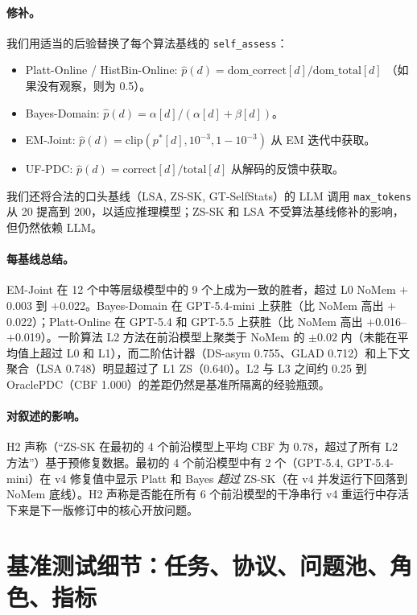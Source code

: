 \documentclass[11pt,a4paper,fontset=fandol]{ctexart}
\begin{document}
\paragraph{修补。} 我们用适当的后验替换了每个算法基线的 \texttt{self\_assess}：
\begin{itemize}[nosep,leftmargin=1.4em]
  \item Platt-Online / HistBin-Online: $\hat p(d) = \mathrm{dom\_correct}[d] / \mathrm{dom\_total}[d]$ （如果没有观察，则为 0.5）。
  \item Bayes-Domain: $\hat p(d) = \alpha[d]/(\alpha[d]+\beta[d])$。
  \item EM-Joint: $\hat p(d) = \mathrm{clip}(p^*[d], 10^{-3}, 1{-}10^{-3})$ 从 EM 迭代中获取。
  \item UF-PDC: $\hat p(d) = \mathrm{correct}[d]/\mathrm{total}[d]$ 从解码的反馈中获取。
\end{itemize}
我们还将合法的口头基线（LSA, ZS-SK, GT-SelfStats）的 LLM 调用 \texttt{max\_tokens} 从 20 提高到 200，以适应推理模型；ZS-SK 和 LSA 不受算法基线修补的影响，但仍然依赖 LLM。

\paragraph{每基线总结。} EM-Joint 在 12 个中等层级模型中的 9 个上成为一致的胜者，超过 L0 NoMem $+$0.003 到 $+$0.022。Bayes-Domain 在 GPT-5.4-mini 上获胜（比 NoMem 高出 $+$0.022）；Platt-Online 在 GPT-5.4 和 GPT-5.5 上获胜（比 NoMem 高出 $+$0.016--$+$0.019）。一阶算法 L2 方法在前沿模型上聚类于 NoMem 的 $\pm 0.02$ 内（未能在平均值上超过 L0 和 L1），而二阶估计器（DS-asym 0.755、GLAD 0.712）和上下文聚合（LSA 0.748）明显超过了 L1 ZS（0.640）。L2 与 L3 之间约 0.25 到 OraclePDC（CBF 1.000）的差距仍然是基准所隔离的经验瓶颈。



\paragraph{对叙述的影响。} H2 声称（“ZS-SK 在最初的 4 个前沿模型上平均 CBF 为 0.78，超过了所有 L2 方法”）基于预修复数据。最初的 4 个前沿模型中有 2 个（GPT-5.4, GPT-5.4-mini）在 v4 修复值中显示 Platt 和 Bayes \emph{超过} ZS-SK（在 v4 并发运行下回落到 NoMem 底线）。H2 声称是否能在所有 6 个前沿模型的干净串行 v4 重运行中存活下来是下一版修订中的核心开放问题。

\section{基准测试细节：任务、协议、问题池、角色、指标}
\label{app:bench_details}
\end{document}

